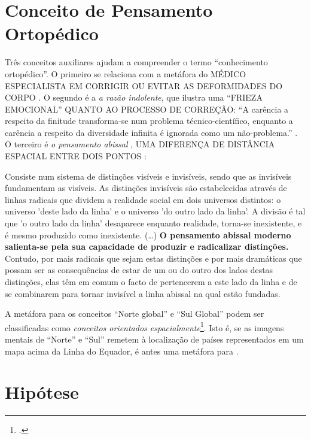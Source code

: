 \section{Conceito de Pensamento Ortopédico}

Três conceitos auxiliares ajudam a compreender o termo ``conhecimento ortopédico''. O primeiro se relaciona com a metáfora do \scriptsize MÉDICO ESPECIALISTA EM CORRIGIR OU EVITAR AS DEFORMIDADES DO CORPO \normalsize {}. O segundo é a \emph{a razão indolente}, que ilustra uma \scriptsize ``FRIEZA EMOCIONAL'' QUANTO AO PROCESSO DE CORREÇÃO\normalsize : ``A carência a respeito da finitude transforma-se num problema técnico-científico, enquanto a carência a respeito da diversidade infinita é ignorada como um não-problema.'' \cite[p.~15]{santos_filosofia_2008}. O terceiro é \emph{o pensamento abissal} \cite[p.~1--4]{santos_abissal_2007}, \scriptsize UMA DIFERENÇA DE DISTÂNCIA ESPACIAL ENTRE DOIS PONTOS \normalsize:

\begin{citacao}
Consiste num sistema de distinções visíveis e invisíveis, sendo que as invisíveis fundamentam as visíveis. As distinções invisíveis são estabelecidas através de linhas radicais que dividem a realidade social em dois universos distintos: o universo  'deste lado da linha' e o universo 'do outro lado da linha'. A divisão é tal que 'o outro lado da linha' desaparece enquanto realidade, torna-se inexistente, e é mesmo produzido como inexistente. (\ldots) \textbf{O pensamento abissal moderno salienta-se pela sua capacidade de produzir e radicalizar distinções.} Contudo, por mais radicais que sejam estas distinções e por mais dramáticas que possam ser as consequências de estar de um ou do outro dos lados destas distinções, elas têm em comum o facto de pertencerem a este lado da linha e de se combinarem para tornar invisível a linha abissal na qual estão fundadas. \end{citacao}

A metáfora para os conceitos ``Norte global'' e ``Sul Global'' podem ser classificadas como \emph{conceitos orientados espacialmente}\footnote{.}. Isto é, se as imagens mentais de ``Norte'' e ``Sul'' remetem à localização de países representados em um mapa acima da Linha do Equador, é antes uma metáfora para .  

\section{Hipótese}

